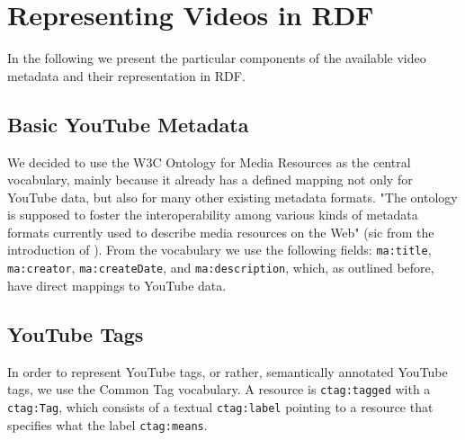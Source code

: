 \documentclass{acm_proc_article-sp}
\begin{document}
\section{Representing Videos in RDF}\label{sec:representing}
In the following we present the particular components of the available video metadata and their representation in RDF.

\subsection{Basic YouTube Metadata}\label{sec:metadata}
We decided to use the W3C Ontology for Media Resources\cite{W3C:MediaOntology} as the central vocabulary, mainly because it already has a defined mapping not only for YouTube data, but also for many other existing metadata formats. "The ontology is supposed to foster the interoperability among various kinds of metadata formats currently used to describe media resources on the Web" (sic from the introduction of \cite{W3C:MediaOntology}). From the vocabulary we use the following fields: \texttt{ma:title}, \texttt{ma:creator}, \texttt{ma:createDate}, and \texttt{ma:description}, which, as outlined before, have direct mappings to YouTube data. 

\subsection{YouTube Tags}\label{sec:youtube}
In order to represent YouTube tags, or rather, semantically annotated YouTube tags, we use the Common Tag\cite{CommonTag:Spec} vocabulary. A resource is \texttt{ctag:tagged} with a \texttt{ctag:Tag}, which consists of a textual \texttt{ctag:label} pointing to a resource that specifies what the label \texttt{ctag:means}.
\end{document}
